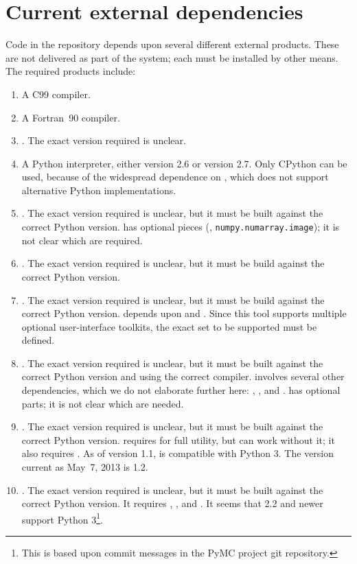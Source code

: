 \documentclass[draftmode,draftwater]{memarticle}
\newcommand{\despipe}{\name{des-pipe}\xspace}
\begin{document}
\section{Current external dependencies}

Code in the \despipe repository depends upon several different
external products. These are not delivered as part of the
\despipe system; each must be installed by other means. The
required products include:
\begin{enumerate}
\item A C99 compiler.
\item A Fortran~90 compiler.
\item {}. The exact version required is unclear.
\item A Python interpreter, either version 2.6 or version 2.7. Only
  CPython can be used, because of the widespread dependence on
  , which does not support alternative Python
  implementations.
\item {}. The exact version required is unclear, but it must
  be built against the correct Python version.  has optional
  pieces (\eg, \texttt{numpy.numarray.image}); it is not clear which are
  required.
\item {}. The exact version required is unclear, but it must
  be build against the correct Python version.
\item {}. The exact version required is unclear, but it
  must be build against the correct Python version. 
  depends upon  and . Since this tool
  supports multiple optional user-interface toolkits, the exact set to
  be supported must be defined.
\item {}. The exact version required is unclear, but it must
  be built against the correct Python version and using the correct
  \cpp{} compiler.  involves several other dependencies,
  which we do not elaborate further here: ,
  , and .  has optional parts; it is
  not clear which are needed.
\item {}. The exact version required is unclear, but it must
  be built against the correct Python version.  requires
   for full utility, but can work without it; it also
  requires . As of version 1.1,  is compatible
  with Python 3. The version current as May~7, 2013 is 1.2.
\item {}. The exact version required is unclear, but it must be
  built against the correct Python version. It requires ,
  , and . It seems that  2.2 and
  newer support Python 3\footnote{This is based upon commit messages in
    the PyMC project git repository.}.
\end{enumerate}
\end{document}
